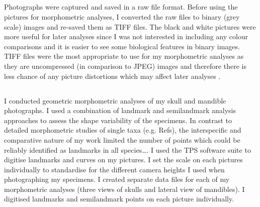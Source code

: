 \subsection{}
Photographs were captured and saved in a raw file format. Before using the pictures for morphometric analyses, I converted the raw files to binary (grey scale) images and re-saved them as TIFF files. The black and white pictures were more useful for later analyses since I was not interested in including any colour comparisons and it is easier to see some biological features in binary images. TIFF files were the most appropriate to use for my morphometric analyses as they are uncompressed (in comparison to JPEG) images and therefore there is less chance of any picture distortions which may affect later analyses \citep{HERC2013}.

\subsection{}

I conducted geometric morphometric analyses of my skull and mandible photographs. I used a combination of landmark and semilandmark analysis approaches to assess the shape variability of the specimens. In contrast to detailed morphometric studies of single taxa (e.g. Refs), the interspecific and comparative nature of my work limited the number of points which could be reliably identified as landmarks in all species….
I used the TPS software suite \citep{Rohlf2013} to digitise landmarks and curves on my pictures. I set the scale on each pictures individually to standardise for the different camera heights I used when photographing my specimens. I created separate data files for each of my morphometric analyses (three views of skulls and lateral view of mandibles). I digitised landmarks and semilandmark points on each picture individually.

